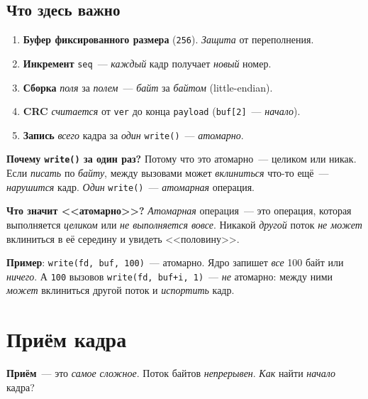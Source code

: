 \subsection{Что здесь важно}

\begin{enumerate}
    \item \textbf{Буфер фиксированного размера} (\texttt{256}).
          \emph{Защита} от переполнения.
    \item \textbf{Инкремент} \texttt{seq}~--- \emph{каждый} кадр
          получает \emph{новый} номер.
    \item \textbf{Сборка} \emph{поля} за \emph{полем}~---
          \emph{байт} за \emph{байтом} (little-endian).
    \item \textbf{CRC} \emph{считается} от \texttt{ver} до конца
          \texttt{payload} (\texttt{buf[2]}~--- \emph{начало}).
    \item \textbf{Запись} \emph{всего} кадра за \emph{один}
          \texttt{write()}~--- \emph{атомарно}.
\end{enumerate}

\begin{warnbox}
\textbf{Почему \texttt{write()} за один раз?} Потому что это атомарно~--- целиком или никак. Если \emph{писать} по \emph{байту}, между вызовами может \emph{вклиниться} что-то ещё~--- \emph{нарушится} кадр. \emph{Один} \texttt{write()}~--- \emph{атомарная} операция.
\end{warnbox}

\begin{keybox}
\textbf{Что значит <<атомарно>>?} \emph{Атомарная} операция~---
это операция, которая выполняется \emph{целиком} или
\emph{не выполняется вовсе}. Никакой \emph{другой} поток
\emph{не может} вклиниться в её середину и увидеть
<<половину>>.

\textbf{Пример}: \texttt{write(fd, buf, 100)}~--- атомарно.
Ядро запишет \emph{все} 100 байт или \emph{ничего}.
А \texttt{100} вызовов \texttt{write(fd, buf+i, 1)}~---
\emph{не} атомарно: между ними \emph{может} вклиниться
другой поток и \emph{испортить} кадр.
\end{keybox}


\section{Приём кадра}
\label{sec:protocol-receive}

\textbf{Приём}~--- это \emph{самое} \emph{сложное}. Поток
байтов \emph{непрерывен}. \emph{Как} найти \emph{начало}
кадра?


